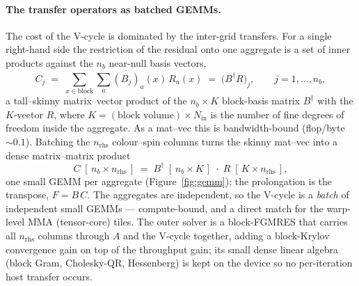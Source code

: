 \documentclass[12pt,a4paper]{article}
\newcommand{\Aop}{A}
\newcommand{\dg}{^{\dagger}}
\begin{document}
\paragraph{The transfer operators as batched GEMMs.}
The cost of the V-cycle is dominated by the inter-grid transfers. For a single
right-hand side the restriction of the residual onto one aggregate is a set of
inner products against the $n_b$ near-null basis vectors,
\begin{equation}
  C_{j} \;=\; \sum_{x\in\text{block}}\sum_{a} \overline{(B_j)}_{a}(x)\, R_{a}(x)
  \;=\; \big(B\dg R\big)_j ,\qquad j=1,\dots,n_b ,
  \label{eq:restrict}
\end{equation}
a tall--skinny matrix--vector product of the $n_b\times K$ block-basis matrix
$B\dg$ with the $K$-vector $R$, where $K=(\text{block volume})\times N_{\mathrm{in}}$
is the number of fine degrees of freedom inside the aggregate. As a mat--vec this
is bandwidth-bound (flop/byte $\sim\!0.1$). Batching the $n_{\mathrm{rhs}}$
colour--spin columns turns the skinny mat--vec into a dense matrix--matrix product
\begin{equation}
  C\;[\,n_b\times n_{\mathrm{rhs}}\,]
  \;=\;
  B\dg\;[\,n_b\times K\,]\;\cdot\;R\;[\,K\times n_{\mathrm{rhs}}\,] ,
  \label{eq:restrictGEMM}
\end{equation}
one small GEMM per aggregate (Figure~\ref{fig:gemm}); the prolongation is the
transpose, $F=B\,C$. The aggregates are independent, so the V-cycle is a
\emph{batch} of independent small GEMMs --- compute-bound, and a direct match for
the warp-level MMA (tensor-core) tiles. The outer solver is a block-FGMRES that
carries all $n_{\mathrm{rhs}}$ columns through $\Aop$ and the V-cycle together,
adding a block-Krylov convergence gain on top of the throughput gain; its
small dense linear algebra (block Gram, Cholesky-QR, Hessenberg) is kept on the
device so no per-iteration host transfer occurs.
\end{document}
